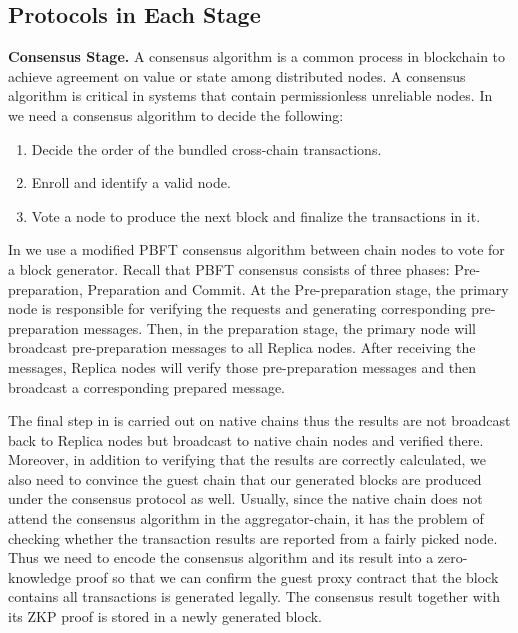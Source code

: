 \subsection{Protocols in Each Stage}
\textbf{Consensus Stage.}
\label{consensus-stage}
A consensus algorithm is a common process in blockchain to achieve agreement on value or state among distributed nodes. A consensus algorithm is critical in systems that contain permissionless unreliable nodes. In \dprotocol we need a consensus algorithm to decide the following:

\begin{enumerate}[leftmargin=*]
\item Decide the order of the bundled cross-chain transactions.
\item Enroll and identify a valid node.
\item Vote a node to produce the next block and finalize the transactions in it. 
\end{enumerate}

In \dprotocol we use a modified PBFT \cite{castro1999practical} consensus algorithm between chain nodes to vote for a block generator. Recall that PBFT consensus consists of three phases: Pre-preparation, Preparation and Commit. At the Pre-preparation stage, the primary node is responsible for verifying the requests and generating corresponding pre-preparation messages. Then, in the preparation stage, the primary node will broadcast pre-preparation messages to all Replica nodes. After receiving the messages, Replica nodes will verify those pre-preparation messages and then broadcast a corresponding prepared message.

The final step in \dprotocol is carried out on native chains thus the results are not broadcast back to Replica nodes but broadcast to native chain nodes and verified there. Moreover, in addition to verifying that the results are correctly calculated, we also need to convince the guest chain that our generated blocks are produced under the consensus protocol as well. Usually, since the native chain does not attend the consensus algorithm in the aggregator-chain, it has the problem of checking whether the transaction results are reported from a fairly picked node. Thus we need to encode the consensus algorithm and its result into a zero-knowledge proof so that we can confirm the guest proxy contract that the block contains all transactions is generated legally. The consensus result together with its ZKP proof is stored in a newly generated block.

